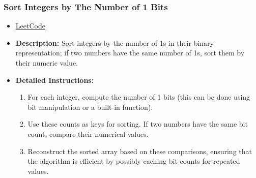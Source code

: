 \subsubsection{Sort Integers by The Number of 1 Bits}
\begin{itemize}
    \item \href{https://leetcode.com/problems/sort-integers-by-the-number-of-1-bits/}{LeetCode}
    \item \textbf{Description:} Sort integers by the number of 1s in their binary representation; if two numbers have the same number of 1s, sort them by their numeric value.
    \item \textbf{Detailed Instructions:}
    \begin{enumerate}
        \item For each integer, compute the number of 1 bits (this can be done using bit manipulation or a built-in function).
        \item Use these counts as keys for sorting. If two numbers have the same bit count, compare their numerical values.
        \item Reconstruct the sorted array based on these comparisons, ensuring that the algorithm is efficient by possibly caching bit counts for repeated values.
    \end{enumerate}
\end{itemize}